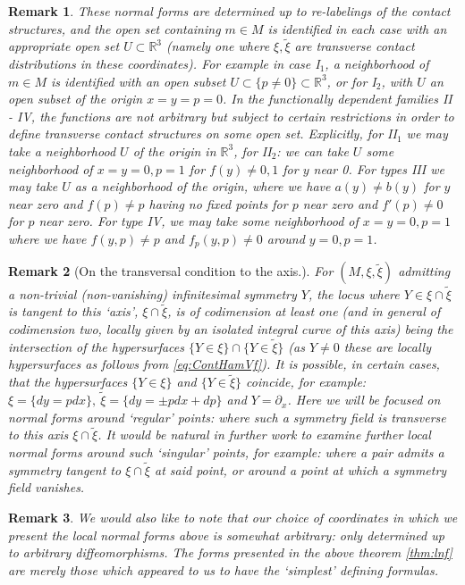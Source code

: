 \documentclass[10pt]{amsart}
\newcommand{\R}{\mathbb{R}}
\newcommand{\del}{\partial}
\theoremstyle{definition}
\newtheorem{rem}{Remark}
\begin{document}
\begin{rem} {\em These normal forms are determined up to re-labelings of the contact structures, and the open set containing $m\in M$ is identified in each case with an appropriate open set $U\subset \R^3$ (namely one where $\xi, \tilde\xi$ are transverse contact distributions in these coordinates). For example in case I$_1$, a neighborhood of $m\in M$ is identified with an open subset $U\subset \{ p\ne 0\} \subset\R^3$, or for I$_2$, with $U$ an open subset of the origin $x = y = p = 0$. In the functionally dependent families II - IV, the functions are not arbitrary but subject to certain restrictions in order to define transverse contact structures on some open set. Explicitly, for II$_1$ we may take a neighborhood $U$ of the origin in $\R^3$, for II$_2$: we can take $U$ some neighborhood of $x = y = 0, p = 1$ for $f(y)\ne 0,1$ for $y$ near 0. For types III we may take $U$ as a neighborhood of the origin, where we have $a(y)\ne b(y)$ for $y$ near zero and $f(p)\ne p$ having no fixed points for $p$ near zero and $f'(p)\ne 0$ for $p$ near zero. For type IV, we may take some neighborhood of $x = y = 0, p = 1$ where we have $f(y,p)\ne p$ and $f_p(y,p)\ne 0$ around $y = 0, p = 1$.}
\end{rem}

\begin{rem}[On the transversal condition to the axis.]
{\em For $(M, \xi, \tilde \xi)$ admitting a non-trivial (non-vanishing) infinitesimal symmetry $Y$, the locus where $Y \in \xi\cap \tilde \xi$ is tangent to this `axis', $\xi\cap \tilde\xi$, is of codimension at least one (and in general of codimension two, locally given by an isolated integral curve of this axis) being the intersection of the hypersurfaces $\{ Y\in \xi\} \cap \{ Y\in \tilde \xi\}$ (as $Y\ne 0$ these are locally hypersurfaces as follows from \eqref{eq:ContHamVf}). It is possible, in certain cases, that the hypersurfaces $\{Y\in \xi\}$ and $\{Y\in \tilde\xi\}$ coincide, for example: $\xi = \{ dy = pdx \}, ~\tilde\xi = \{ dy = \pm pdx + dp \}$ and $Y = \del_x$. Here we will be focused on normal forms around `regular' points: where such a symmetry field is transverse to this axis $\xi \cap \tilde \xi$. It would be natural in further work to examine further local normal forms around such `singular' points, for example: where a pair admits a symmetry tangent to $\xi\cap\tilde\xi$ at said point, or around a point at which a symmetry field vanishes.}
\end{rem}


\begin{rem}
{\em We would also like to note that our choice of coordinates in which we present the local normal forms above is somewhat arbitrary: only determined up to arbitrary diffeomorphisms. The forms presented in the above theorem \ref{thm:lnf} are merely those which appeared to us to have the `simplest' defining formulas.}
\end{rem}
\end{document}
